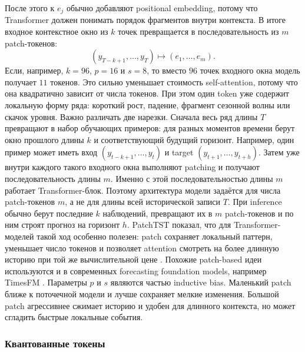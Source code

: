 \documentclass[12pt,fleqn]{article}
\begin{document}
После этого к $e_j$ обычно добавляют positional embedding, потому что Transformer должен понимать порядок фрагментов внутри контекста.
В итоге входное контекстное окно из $k$ точек превращается в последовательность из $m$ patch-токенов:
\begin{equation}
  (y_{T-k+1}, \ldots, y_T)
  \longmapsto
  (e_1, \ldots, e_m).
\end{equation}
Если, например, $k=96$, $p=16$ и $s=8$, то вместо $96$ точек входного окна модель получает $11$ токенов.
Это сильно уменьшает стоимость self-attention, потому что она квадратично зависит от числа токенов.
При этом один token уже содержит локальную форму ряда: короткий рост, падение, фрагмент сезонной волны или скачок уровня.
Важно различать две нарезки.
Сначала весь ряд длины $T$ превращают в набор обучающих примеров: для разных моментов времени берут окно прошлого длины $k$ и соответствующий будущий горизонт.
Например, один пример может иметь вход $(y_{t-k+1}, \ldots, y_t)$ и target $(y_{t+1}, \ldots, y_{t+h})$.
Затем уже внутри каждого такого входного окна выполняют patching и получают последовательность длины $m$.
Именно с этой последовательностью длины $m$ работает Transformer-блок.
Поэтому архитектура модели задаётся для числа patch-токенов $m$, а не для длины всей исторической записи $T$.
При inference обычно берут последние $k$ наблюдений, превращают их в $m$ patch-токенов и по ним строят прогноз на горизонт $h$.
PatchTST показал, что для Transformer-моделей такой ход особенно полезен: patch сохраняет локальный паттерн, уменьшает число токенов и позволяет attention смотреть на более длинную историю при той же вычислительной цене \cite{nie2023patchtst}.
Похожие patch-based идеи используются и в современных forecasting foundation models, например TimesFM \cite{das2024timesfm}.
Параметры $p$ и $s$ являются частью inductive bias.
Маленький patch ближе к поточечной модели и лучше сохраняет мелкие изменения.
Большой patch агрессивнее сжимает историю и удобен для длинного контекста, но может сгладить быстрые локальные события.

\subsubsection{Квантованные токены}
\end{document}
